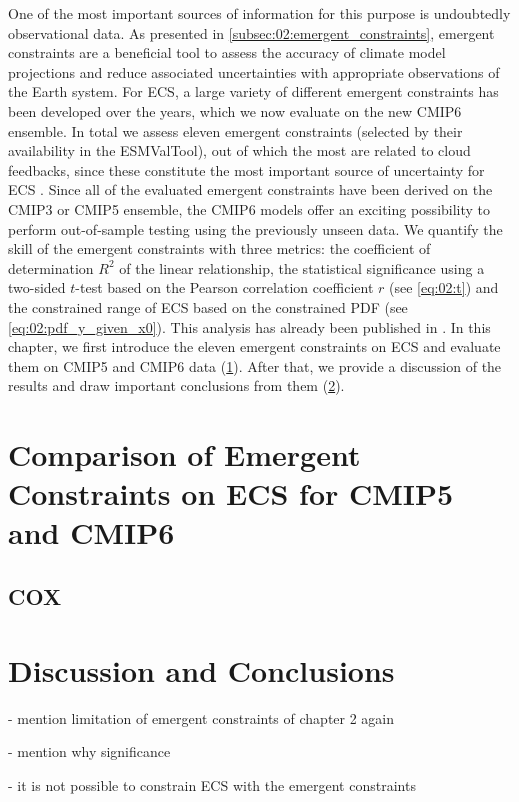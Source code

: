 One of the most important sources of information for this purpose is
undoubtedly observational data. As presented in
\cref{subsec:02:emergent_constraints}, emergent constraints are a beneficial
tool to assess the accuracy of climate model projections and reduce associated
uncertainties with appropriate observations of the Earth system. For \ac{ECS},
a large variety of different emergent constraints has been developed over the
years, which we now evaluate on the new \acs{CMIP}6 ensemble. In total we
assess eleven emergent constraints (selected by their availability in the
\ac{ESMValTool}), out of which the most are related to cloud feedbacks, since
these constitute the most important source of uncertainty for \ac{ECS}
. Since all of the evaluated emergent
constraints have been derived on the \acs{CMIP}3 or \ac{CMIP}5 ensemble, the
\ac{CMIP}6 models offer an exciting possibility to perform out-of-sample
testing using the previously unseen data. We quantify the skill of the emergent
constraints with three metrics: the coefficient of determination $R^2$ of the
linear relationship, the statistical significance using a two-sided $t$-test
based on the Pearson correlation coefficient $r$ (see \cref{eq:02:t}) and the
constrained range of \ac{ECS} based on the constrained \ac{PDF} (see
\cref{eq:02:pdf_y_given_x0}). This analysis has already been published in
\textcite{Schlund2020a}. In this chapter, we first introduce the eleven
emergent constraints on \acs{ECS} and evaluate them on \acs{CMIP}5 and
\acs{CMIP}6 data (\cref{sec:05:comparison_of_emergent_constraints}). After
that, we provide a discussion of the results and draw important conclusions
from them (\cref{sec:05:discussion_and_conclusions}).


\section{Comparison of Emergent Constraints on \acs{ECS} for \acs{CMIP}5 and
  \acs{CMIP}6}
\label{sec:05:comparison_of_emergent_constraints}


\subsection{COX}
\label{subsec:05:cox}


\section{Discussion and Conclusions}
\label{sec:05:discussion_and_conclusions}

- mention limitation of emergent constraints of chapter 2 again

- mention why significance

- it is not possible to constrain ECS with the emergent constraints
